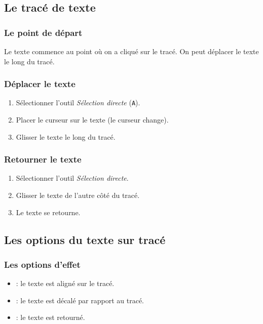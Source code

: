 \subsection{Le tracé de texte}

\subsubsection{Le point de départ}

Le texte commence au point où on a cliqué sur le tracé. On peut déplacer le texte le long du tracé.

\subsubsection{Déplacer le texte}

\begin{enumerate}
    \item Sélectionner l'outil \emph{Sélection directe} (\texttt{A}).
    \item Placer le curseur sur le texte (le curseur change).
    \item Glisser le texte le long du tracé.
\end{enumerate}

\subsubsection{Retourner le texte}

\begin{enumerate}
    \item Sélectionner l'outil \emph{Sélection directe}.
    \item Glisser le texte de l'autre côté du tracé.
    \item Le texte se retourne.
\end{enumerate}

\subsection{Les options du texte sur tracé}

\subsubsection{Les options d'effet}

\begin{itemize}
    \item {} : le texte est aligné sur le tracé.
    \item {} : le texte est décalé par rapport au tracé.
    \item {} : le texte est retourné.
\end{itemize}

